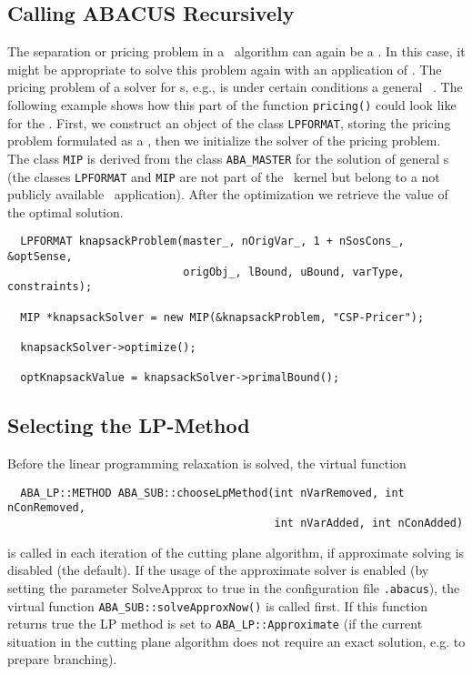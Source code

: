 \subsection{Calling ABACUS Recursively}
\noindent
The separation or pricing problem in a \bab\ algorithm can again be
a \mip. In this case, it might be appropriate to solve this problem
again with an application of \ABACUS. The pricing problem of a
solver for \bcsp s, e.g., is under certain conditions a general \mip\
\cite{VBJN94}. The
following example shows how this part of the function {\tt pricing()}
could look like for the \bcsp.
First, we construct an object of the
class {\tt LPFORMAT}, storing the pricing problem formulated as a
\mip, then we initialize the solver of the pricing problem.
The class {\tt MIP} is derived from the class {\tt ABA\_MASTER} for the solution
of general \mip s (the classes {\tt LPFORMAT} and {\tt MIP} are not
part of the \ABACUS\ kernel but belong to
a not publicly available \ABACUS\ application). 
After the optimization we retrieve the value of the optimal
solution.
\begin{verbatim}
  LPFORMAT knapsackProblem(master_, nOrigVar_, 1 + nSosCons_, &optSense,
                           origObj_, lBound, uBound, varType, constraints);

  MIP *knapsackSolver = new MIP(&knapsackProblem, "CSP-Pricer");

  knapsackSolver->optimize();

  optKnapsackValue = knapsackSolver->primalBound();
\end{verbatim}

\subsection{Selecting the LP-Method}
\label{section:selectingLpMethod}

Before the linear programming relaxation is solved, the virtual
function 
\begin{verbatim}
  ABA_LP::METHOD ABA_SUB::chooseLpMethod(int nVarRemoved, int nConRemoved,
                                         int nVarAdded, int nConAdded)
\end{verbatim}
is called in each iteration of the cutting plane algorithm, if approximate
solving is disabled (the default).
If the usage of the approximate solver is enabled (by setting the parameter 
SolveApprox to true in the configuration file {\tt .abacus}), the virtual
function {\tt ABA\_SUB::solveApproxNow()} is called first. If this function 
returns true the LP method is set to {\tt ABA\_LP::Approximate} (if the 
current situation in the cutting plane algorithm does not require an exact
solution, e.g. to prepare branching).

